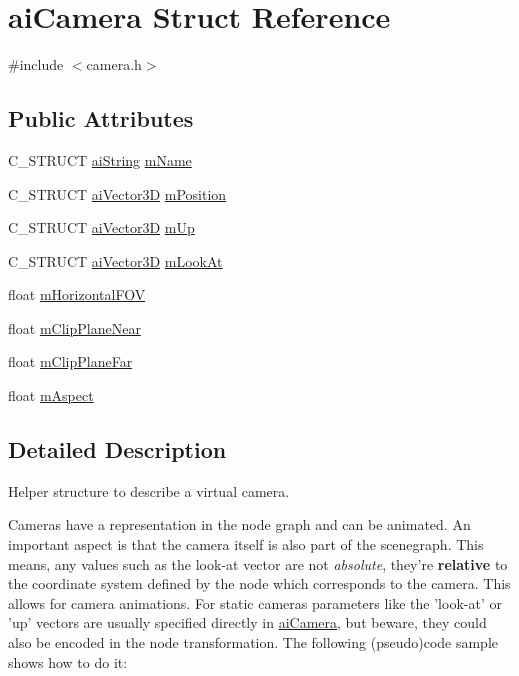 \hypertarget{structai_camera}{\section{ai\-Camera Struct Reference}
\label{structai_camera}
}


{\ttfamily \#include $<$camera.\-h$>$}

\subsection*{Public Attributes}
\begin{DoxyCompactItemize}
\item 
C\-\_\-\-S\-T\-R\-U\-C\-T \hyperlink{structai_string}{ai\-String} \hyperlink{structai_camera_aa6a5fe5e04b3db1b23f69eb9910c6816}{m\-Name}
\item 
C\-\_\-\-S\-T\-R\-U\-C\-T \hyperlink{structai_vector3_d}{ai\-Vector3\-D} \hyperlink{structai_camera_a518617ea192ca0698e748a4399e7c3a5}{m\-Position}
\item 
C\-\_\-\-S\-T\-R\-U\-C\-T \hyperlink{structai_vector3_d}{ai\-Vector3\-D} \hyperlink{structai_camera_a7fb42b287389b4f99c883098268d6d1a}{m\-Up}
\item 
C\-\_\-\-S\-T\-R\-U\-C\-T \hyperlink{structai_vector3_d}{ai\-Vector3\-D} \hyperlink{structai_camera_af9463249ac870e030fa435b1186cef23}{m\-Look\-At}
\item 
float \hyperlink{structai_camera_adcdea73ece19ea0a9068f5544ec23592}{m\-Horizontal\-F\-O\-V}
\item 
float \hyperlink{structai_camera_a720e8c94c036dcefe4b13cc1c69c521e}{m\-Clip\-Plane\-Near}
\item 
float \hyperlink{structai_camera_aa9ccf77e3d7ca3dc8f46df931b65172f}{m\-Clip\-Plane\-Far}
\item 
float \hyperlink{structai_camera_ae414556eaa6f910b5927f465d97bf70c}{m\-Aspect}
\end{DoxyCompactItemize}


\subsection{Detailed Description}
Helper structure to describe a virtual camera.

Cameras have a representation in the node graph and can be animated. An important aspect is that the camera itself is also part of the scenegraph. This means, any values such as the look-\/at vector are not {\itshape absolute}, they're {\bfseries relative} to the coordinate system defined by the node which corresponds to the camera. This allows for camera animations. For static cameras parameters like the 'look-\/at' or 'up' vectors are usually specified directly in \hyperlink{structai_camera}{ai\-Camera}, but beware, they could also be encoded in the node transformation. The following (pseudo)code sample shows how to do it\-: \par
\par
 
